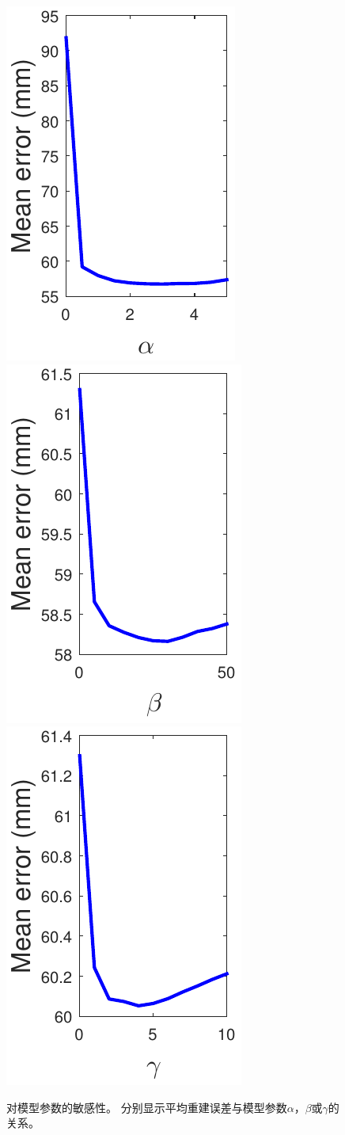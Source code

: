 \begin{figure}
  \includegraphics[width=0.32\linewidth]{figures/alpha.pdf} \hfill
  \includegraphics[width=0.32\linewidth]{figures/beta.pdf} \hfill
  \includegraphics[width=0.32\linewidth]{figures/gamma.pdf}
  \caption{对模型参数的敏感性。 分别显示平均重建误差与模型参数$\alpha$，$\beta$或$\gamma$的关系。}\label{fig:par}
\end{figure}

